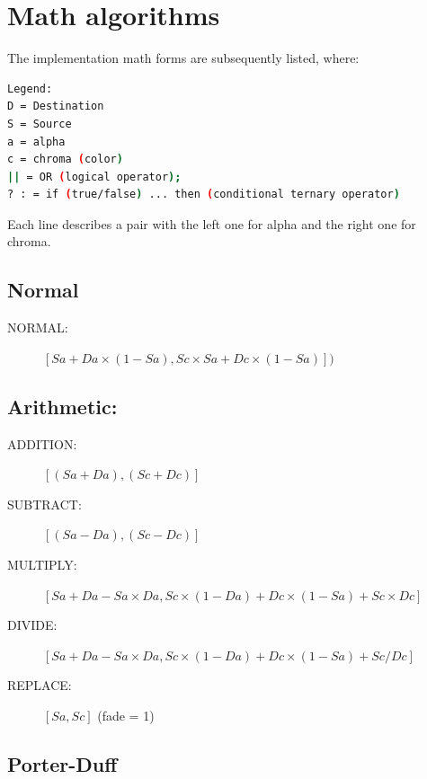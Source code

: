 \section{Math algorithms}%
\label{sec:math_algorithms}

The implementation math forms are subsequently listed, where:

\vspace{2ex}
\begin{lstlisting}[language=bash]
Legend:
D = Destination
S = Source
a = alpha
c = chroma (color)
|| = OR (logical operator); 
? : = if (true/false) ... then (conditional ternary operator)
\end{lstlisting}

Each line describes a pair with the left one for alpha and the right one for chroma.

\subsection*{Normal}%
\label{sub:normal}

\begin{description}
    \item[NORMAL:] $[Sa + Da \times (1 - Sa), Sc \times Sa + Dc \times(1 - Sa)])$
\end{description}

\subsection*{Arithmetic:}%
\label{sub:arithmetic}

\begin{description}
    \item[ADDITION:] $[(Sa + Da), (Sc + Dc)]$
    \item[SUBTRACT:] $[(Sa - Da), (Sc - Dc)]$
    \item[MULTIPLY:] $[Sa + Da - Sa \times Da, Sc\times(1 - Da) + Dc\times (1 - Sa) + Sc \times Dc]$
    \item[DIVIDE:] $[Sa + Da - Sa \times Da, Sc\times(1 - Da) + Dc \times (1 - Sa) + Sc/Dc]$
    \item[REPLACE:] $[Sa, Sc]$ (fade = 1)
\end{description}

\subsection*{Porter-Duff}%
\label{sub:porter-duff}

